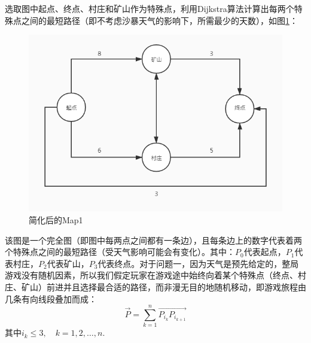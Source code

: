 \documentclass[withoutpre]{cumcmthesis} %
\begin{document}
选取图中起点、终点、村庄和矿山作为特殊点，利用Dijkstra算法计算出每两个特殊点之间的最短路径（即不考虑沙暴天气的影响下，所需最少的天数），如图\ref{fig:map1}：
\begin{figure}[H]
	\centering
	\includegraphics[scale=0.5]{figures/map1new.jpg}
	\caption{简化后的Map1}
	\label{fig:map1}
\end{figure}
该图是一个完全图（即图中每两点之间都有一条边），且每条边上的数字代表着两个特殊点之间的最短路径（受天气影响可能会有变化）。其中：$P_0$代表起点，$P_1$代表村庄，$P_2$代表矿山，$P_3$代表终点。对于问题一，因为天气是预先给定的，整局游戏没有随机因素，所以我们假定玩家在游戏途中始终向着某个特殊点（终点、村庄、矿山）前进并且选择最合适的路径，而非漫无目的地随机移动，即游戏旅程由几条有向线段叠加而成：
\begin{equation}
	\overrightarrow{P}=\sum_{k=1}^{n}\overrightarrow{P_{i_k}P_{i_{k+1}}}
\end{equation}
其中$i_k\leqslant3,\quad k=1,2,\dots,n$.

\begin{thebibliography}{9}%

    

\end{thebibliography}
\end{document}
